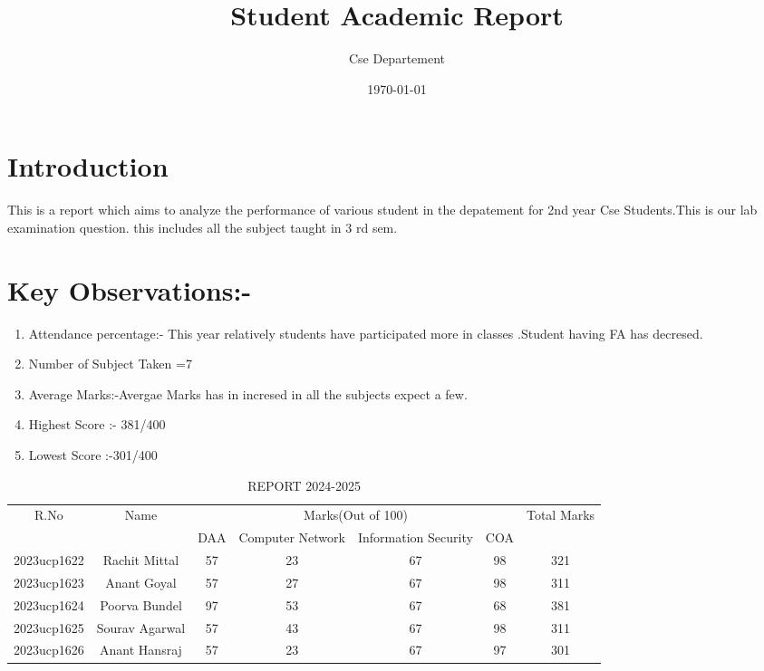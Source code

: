 \documentclass{article}
\title{\textbf{Student Academic Report}}
\author{Cse Departement}
\date{\today}
\begin{document}
\maketitle

\section{Introduction}
This is a report which aims to analyze the performance of various student in the depatement for 2nd year Cse Students.This is our lab examination question.
this includes all the subject taught in 3 rd sem.
\section{Key Observations:-}
\begin{enumerate}
    \item Attendance percentage:- This year relatively students have participated more in classes .Student having FA has decresed.\\
    \item Number of Subject Taken =7\\
    \item Average Marks:-Avergae Marks has in incresed in all the subjects expect a few. 
    \item Highest Score :- 381/400
    \item Lowest Score  :-301/400
\end{enumerate}
\begin{table}[]
    \centering
    \begin{tabular}{|c|c|c|c|c|c|c|}
    \hline
         R.No & Name & \multicolumn{4}{|c|}{Marks(Out of 100)} & Total Marks\\
         \cline{3-6}
               &      & DAA & Computer Network & Information Security & COA & \\
        \hline
        2023ucp1622 & Rachit Mittal & 57 & 23 & 67 & 98 & 321\\
        \hline
        2023ucp1623 & Anant Goyal & 57 & 27 & 67 & 98 & 311\\
        \hline
        2023ucp1624 & Poorva Bundel & 97 & 53 & 67 & 68 & 381\\
        \hline
        2023ucp1625 & Sourav Agarwal & 57 & 43 & 67 & 98 & 311\\
        \hline
        2023ucp1626 & Anant Hansraj & 57 & 23 & 67 & 97 & 301\\
        \hline
         
    \end{tabular}
    \caption{REPORT 2024-2025}

\end{table}
\end{document}
